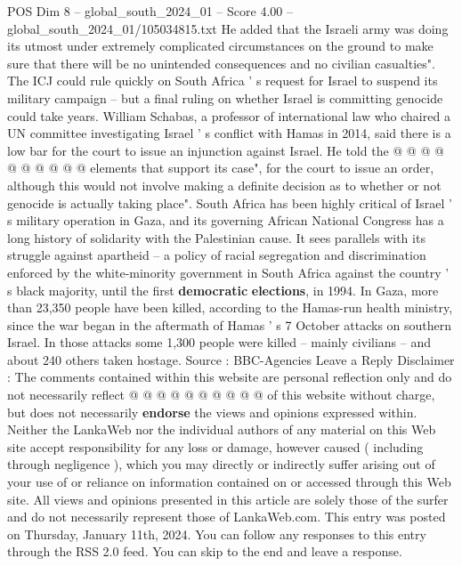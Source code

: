 \begin{textsample}{POS Dim 8 – global\_south\_2024\_01 – Score 4.00 – global\_south\_2024\_01/105034815.txt}
He added that the Israeli army was doing its utmost under extremely complicated circumstances on the ground to make sure that there will be no unintended consequences and no civilian casualties".
The ICJ could rule quickly on South Africa ' s request for Israel to suspend its military campaign -- but a final ruling on whether Israel is committing genocide could take years.
William Schabas, a professor of international law who chaired a UN committee investigating Israel ' s conflict with Hamas in 2014, said there is a low bar for the court to issue an injunction against Israel.
He told the @ @ @ @ @ @ @ @ @ @ elements that support its case", for the court to issue an order, although this would not involve making a definite decision as to whether or not genocide is actually taking place".
South Africa has been highly critical of Israel ' s military operation in Gaza, and its governing African National Congress has a long history of solidarity with the Palestinian cause.
It sees parallels with its struggle against apartheid -- a policy of racial segregation and discrimination enforced by the white-minority government in South Africa against the country ' s black majority, until the first \textbf{democratic} \textbf{elections}, in 1994.
In Gaza, more than 23,350 people have been killed, according to the Hamas-run health ministry, since the war began in the aftermath of Hamas ' s 7 October attacks on southern Israel.
In those attacks some 1,300 people were killed -- mainly civilians -- and about 240 others taken hostage.
Source : BBC-Agencies Leave a Reply Disclaimer : The comments contained within this website are personal reflection only and do not necessarily reflect @ @ @ @ @ @ @ @ @ @ of this website without charge, but does not necessarily \textbf{endorse} the views and opinions expressed within.
Neither the LankaWeb nor the individual authors of any material on this Web site accept responsibility for any loss or damage, however caused ( including through negligence ), which you may directly or indirectly suffer arising out of your use of or reliance on information contained on or accessed through this Web site.
All views and opinions presented in this article are solely those of the surfer and do not necessarily represent those of LankaWeb.com.
This entry was posted on Thursday, January 11th, 2024.
You can follow any responses to this entry through the RSS 2.0 feed.
You can skip to the end and leave a response.

\end{textsample}
